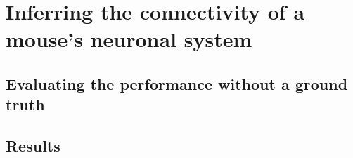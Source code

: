 
\chapter{Inferring the connectivity of a mouse's neuronal system}
\section{Evaluating the performance without a ground truth}
\section{Results}
